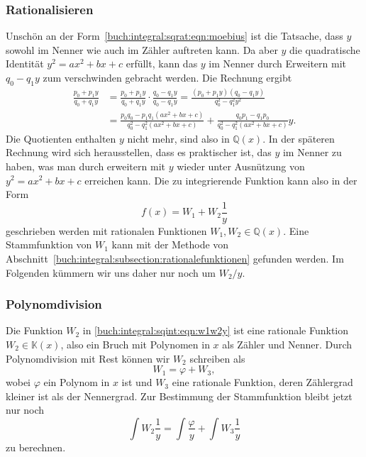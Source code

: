 \subsubsection{Rationalisieren}
Unschön an der Form~\eqref{buch:integral:sqrat:eqn:moebius} ist die
Tatsache, dass $y$ sowohl im Nenner wie auch im Zähler auftreten kann.
Da aber $y$ die quadratische Identität $y^2=ax^2+bx+c$ erfüllt,
kann das $y$ im Nenner durch Erweitern mit $q_0-q_1y$ zum verschwinden
gebracht werden.
Die Rechnung ergibt
\begin{align*}
\frac{p_0+p_1y}{q_0+q_1y}
&=
\frac{p_0+p_1y}{q_0+q_1y}
\cdot
\frac{q_0-q_1y}{q_0-q_1y}
=
\frac{(p_0+p_1y)(q_0-q_1y)}{q_0^2-q_1^2y^2}
\\
&=
\frac{p_0q_0-p_1q_1(ax^2+bx+c)}{q_0^2-q_1^2(ax^2+bx+c)}
+
\frac{q_0p_1-q_1p_0}{q_0^2-q_1^2(ax^2+bx+c)} y.
\end{align*}
Die Quotienten enthalten $y$ nicht mehr, sind also in $\mathbb{Q}(x)$.
In der späteren Rechnung wird sich herausstellen, dass es praktischer ist,
das $y$ im Nenner zu haben, was man durch erweitern mit $y$ wieder
unter Ausnützung von $y^2=ax^2+bx+c$ erreichen kann.
Die zu integrierende Funktion  kann also in der Form
\begin{equation}
f(x)
=
W_1 + W_2\frac{1}{y}
\label{buch:integral:sqint:eqn:w1w2y}
\end{equation}
geschrieben werden mit rationalen Funktionen
$W_1,W_2\in\mathbb{Q}(x)$.
Eine Stammfunktion von $W_1$ kann mit der Methode von
Abschnitt~\ref{buch:integral:subsection:rationalefunktionen}
gefunden werden.
Im Folgenden kümmern wir uns daher nur noch um $W_2/y$.

%
%
\subsubsection{Polynomdivision}
Die Funktion $W_2$ in \eqref{buch:integral:sqint:eqn:w1w2y} ist eine
rationale Funktion $W_2\in \mathbb{K}(x)$, also ein Bruch mit Polynomen
in $x$ als Zähler und Nenner.
Durch Polynomdivision mit Rest können wir $W_2$ schreiben als
\[
W_1 = \varphi + W_3,
\]
wobei $\varphi$ ein Polynom in $x$ ist und $W_3$ eine rationale
Funktion, deren Zählergrad kleiner ist als der Nennergrad.
Zur Bestimmung der Stammfunktion bleibt jetzt nur noch
\begin{equation}
\int W_2\frac{1}{y}
=
\int \frac{\varphi}{y} 
+
\int W_3\frac1{y}
\label{buch:integral:sqint:eqn:Wy}
\end{equation}
zu berechnen.

